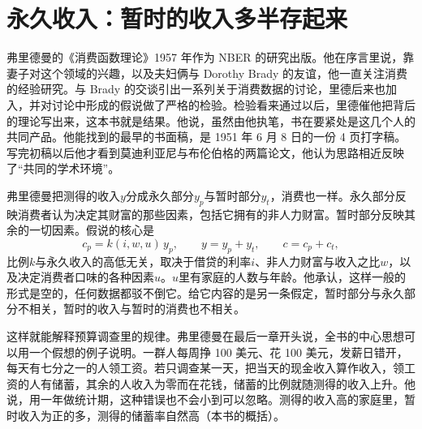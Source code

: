 \section{永久收入：暂时的收入多半存起来}\label{sec:consumption-permanent}

弗里德曼的《消费函数理论》1957 年作为 NBER 的研究出版\cite{friedman1957}。他在序言里说，靠妻子对这个领域的兴趣，以及夫妇俩与 Dorothy Brady 的友谊，他一直关注消费的经验研究\cite{friedman1957}。与 Brady 的交谈引出一系列关于消费数据的讨论，里德后来也加入，并对讨论中形成的假说做了严格的检验\cite{friedman1957}。检验看来通过以后，里德催他把背后的理论写出来，这本书就是结果\cite{friedman1957}。他说，虽然由他执笔，书在要紧处是这几个人的共同产品\cite{friedman1957}。他能找到的最早的书面稿，是 1951 年 6 月 8 日的一份 4 页打字稿\cite{friedman1957}。写完初稿以后他才看到莫迪利亚尼与布伦伯格的两篇论文，他认为思路相近反映了“共同的学术环境”\cite{friedman1957}。

弗里德曼把测得的收入$y$分成永久部分$y_p$与暂时部分$y_t$，消费也一样\cite{friedman1957}。永久部分反映消费者认为决定其财富的那些因素，包括它拥有的非人力财富\cite{friedman1957}。暂时部分反映其余的一切因素\cite{friedman1957}。假说的核心是
\begin{equation}
c_p=k(i,w,u)\,y_p,\qquad y=y_p+y_t,\qquad c=c_p+c_t,\label{eq:consumption-permanent}
\end{equation}
比例$k$与永久收入的高低无关，取决于借贷的利率$i$、非人力财富与收入之比$w$，以及决定消费者口味的各种因素$u$\cite{friedman1957}。$u$里有家庭的人数与年龄\cite{friedman1957}。他承认，这样一般的形式是空的，任何数据都驳不倒它\cite{friedman1957}。给它内容的是另一条假定，暂时部分与永久部分不相关，暂时的收入与暂时的消费也不相关\cite{friedman1957}。

这样就能解释预算调查里的规律。弗里德曼在最后一章开头说，全书的中心思想可以用一个假想的例子说明\cite{friedman1957}。一群人每周挣 100 美元、花 100 美元，发薪日错开，每天有七分之一的人领工资\cite{friedman1957}。若只调查某一天，把当天的现金收入算作收入，领工资的人有储蓄，其余的人收入为零而在花钱，储蓄的比例就随测得的收入上升\cite{friedman1957}。他说，用一年做统计期，这种错误也不会小到可以忽略\cite{friedman1957}。测得的收入高的家庭里，暂时收入为正的多，测得的储蓄率自然高（本书的概括）。

